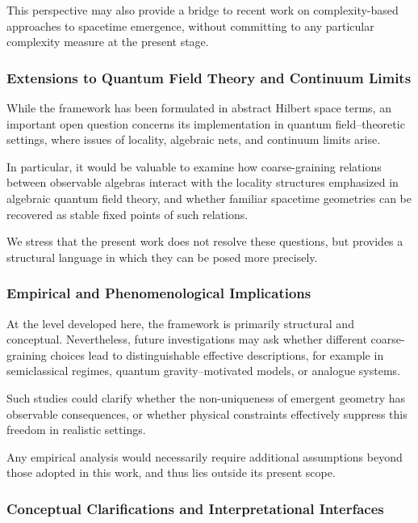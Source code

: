 \documentclass[12pt,a4paper,openany]{book}
\begin{document}
This perspective may also provide a bridge to recent work on complexity-based approaches to spacetime emergence, without committing to any particular complexity measure at the present stage.

\subsubsection{Extensions to Quantum Field Theory and Continuum Limits}

While the framework has been formulated in abstract Hilbert space terms, an important open question concerns its implementation in quantum field--theoretic settings, where issues of locality, algebraic nets, and continuum limits arise.

In particular, it would be valuable to examine how coarse-graining relations between observable algebras interact with the locality structures emphasized in algebraic quantum field theory, and whether familiar spacetime geometries can be recovered as stable fixed points of such relations.

We stress that the present work does not resolve these questions, but provides a structural language in which they can be posed more precisely.

\subsubsection{Empirical and Phenomenological Implications}

At the level developed here, the framework is primarily structural and conceptual. 
Nevertheless, future investigations may ask whether different coarse-graining choices lead to distinguishable effective descriptions, for example in semiclassical regimes, quantum gravity--motivated models, or analogue systems.

Such studies could clarify whether the non-uniqueness of emergent geometry has observable consequences, or whether physical constraints effectively suppress this freedom in realistic settings.

Any empirical analysis would necessarily require additional assumptions beyond those adopted in this work, and thus lies outside its present scope.

\subsubsection{Conceptual Clarifications and Interpretational Interfaces}
\end{document}
